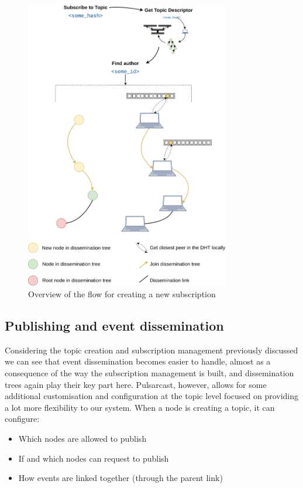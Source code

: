 \begin{figure}[hb!]
  \centering
  \includegraphics[width=0.8\textwidth]{../images/pulsarcast-subscription-flow.png}
  \caption{Overview of the flow for creating a new subscription}
  \label{fig:pulsarcast-subscription-flow}
\end{figure}

\subsection{Publishing and event dissemination}\label{subsec:publishing-and-event-dissemination}

Considering the topic creation and subscription management previously discussed
we can see that event dissemination becomes easier to handle, almost as a
consequence of the way the subscription management is built, and dissemination
trees again play their key part here. Pulsarcast, however, allows for some
additional customisation and configuration at the topic level focused on
providing a lot more flexibility to our system. When a node is creating a
topic, it can configure:
\begin{itemize}
  \item
    Which nodes are allowed to publish
  \item
     If and which nodes can request to publish
  \item
    How events are linked together (through the parent link)
\end{itemize}

